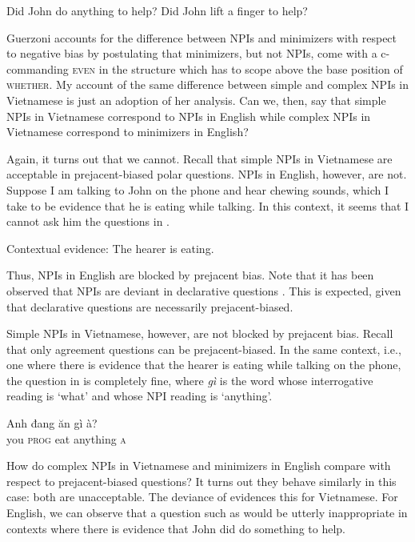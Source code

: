 \documentclass[output=paper,colorlinks,citecolor=brown]{langscibook}
\begin{document}
\ea
\ea Did John do anything to help?\label{help}
\ex Did John lift a finger to help?\label{finger}
\z
\z

Guerzoni accounts for the difference between NPIs and minimizers with respect to negative bias by postulating that minimizers, but not NPIs, come with a c-commanding \textsc{even} in the structure which has to scope above the base position of \textsc{whether}. My account of the same difference between simple and complex NPIs in Vietnamese is just an adoption of her analysis. Can we, then, say that simple NPIs in Vietnamese correspond to NPIs in English while complex NPIs in Vietnamese correspond to minimizers in English?

Again, it turns out that we cannot. Recall that simple NPIs in Vietnamese are acceptable in prejacent-biased polar questions. NPIs in English, however, are not. Suppose I am talking to John on the phone and hear chewing sounds, which I take to be evidence that he is eating while talking. In this context, it seems that I cannot ask him the questions in .

\ea\label{chewing} 
Contextual evidence: The hearer is eating.
\z
\z

Thus, NPIs in English are blocked by prejacent bias. Note that it has been observed that NPIs are deviant in declarative questions \citep{hirst1983interpreting, huddleston1994contrast, gunlogson2002declarative}. This is expected, given that declarative questions are necessarily prejacent-biased. 

Simple NPIs in Vietnamese, however, are not blocked by prejacent bias. Recall that only agreement questions can be prejacent-biased. In the same context, i.e., one where there is evidence that the hearer is eating while talking on the phone, the question in  is completely fine, where \textit{gì} is the word whose interrogative reading is `what' and whose NPI reading is `anything'.

\ea\label{angi}
\gll Anh đang ăn gì à?\\
you \textsc{prog} eat anything \textsc{a}\\
\z

How do complex NPIs in Vietnamese and minimizers in English compare with respect to prejacent-biased questions? It turns out they behave similarly in this case: both are unacceptable. The deviance of  evidences this for Vietnamese. For English, we can observe that a question such as  would be utterly inappropriate in contexts where there is evidence that John did do something to help.
\end{document}

